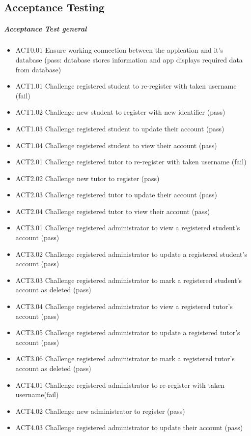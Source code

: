 \documentclass[12pt]{article}
\begin{document}
\subsection{Acceptance Testing}
\subparagraph{Acceptance Test general}
\begin{itemize}
\item ACT0.01	Ensure working connection between the applcation and it's database (pass: database stores information and app displays required data from database)
\item ACT1.01	Challenge registered student to re-register with taken username (fail)
\item ACT1.02	Challenge new student to register with new identifier (pass)
\item ACT1.03	Challenge registered student to update their account (pass)
\item ACT1.04	Challenge registered student to view their account (pass)
\item ACT2.01	Challenge registered tutor to re-register with taken username (fail)
\item ACT2.02	Challenge new tutor to register (pass)
\item ACT2.03	Challenge registered tutor to update their account (pass)
\item ACT2.04	Challenge registered tutor to view their account (pass)
\item ACT3.01	Challenge registered administrator to view a registered student's account (pass)
\item ACT3.02	Challenge registered administrator to update a registered student's account (pass)
\item ACT3.03	Challenge registered administrator to mark a registered student's account as deleted (pass)
\item ACT3.04	Challenge registered administrator to view a registered tutor's account (pass)
\item ACT3.05	Challenge registered administrator to update a registered tutor's account (pass)
\item ACT3.06	Challenge registered administrator to mark a registered tutor's account as deleted (pass)
\item ACT4.01	Challenge registered administrator to re-register with taken username(fail)
\item ACT4.02	Challenge new administrator to register (pass)
\item ACT4.03	Challenge registered administrator to update their account (pass)

\end{itemize}
\end{document}
